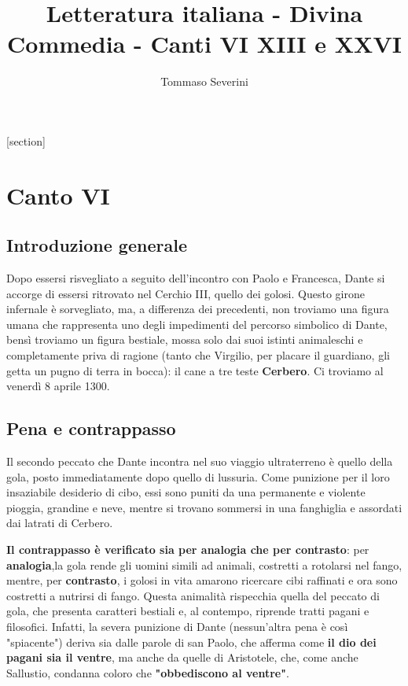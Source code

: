 \documentclass[10pt,a4paper]{article}
\author{Tommaso Severini}
\title{Letteratura italiana - Divina Commedia - Canti VI XIII e XXVI}
\begin{document}
	\maketitle
	
	\tableofcontents
	
	[section]
	
	\section{Canto VI}
	
	\subsection{Introduzione generale}
	
	Dopo essersi risvegliato a seguito dell'incontro con Paolo e Francesca, Dante si accorge di essersi ritrovato nel Cerchio III, quello dei golosi. Questo girone infernale è sorvegliato, ma, a differenza dei precedenti, non troviamo una figura umana che rappresenta uno degli impedimenti del percorso simbolico di Dante, bensì troviamo un figura bestiale, mossa solo dai suoi istinti animaleschi e completamente priva di ragione (tanto che Virgilio, per placare il guardiano, gli getta un pugno di terra in bocca): il cane a tre teste \textbf{Cerbero}. Ci troviamo al venerdì 8 aprile 1300.
	
	\subsection{Pena e contrappasso}
	
	Il secondo peccato che Dante incontra nel suo viaggio ultraterreno è quello della gola, posto immediatamente dopo quello di lussuria. Come punizione per il loro insaziabile desiderio di cibo, essi sono puniti da una permanente e violente pioggia, grandine e neve, mentre si trovano sommersi in una fanghiglia e assordati dai latrati di Cerbero. 
	
	\textbf{Il contrappasso è verificato sia per analogia che per contrasto}: per \textbf{analogia},la gola rende gli uomini simili ad animali, costretti a rotolarsi nel fango, mentre, per \textbf{contrasto}, i golosi in vita amarono ricercare cibi raffinati e ora sono costretti a nutrirsi di fango. Questa animalità rispecchia quella del peccato di gola, che presenta caratteri bestiali e, al contempo, riprende tratti pagani e filosofici. Infatti, la severa punizione di Dante (nessun'altra pena è così "spiacente") deriva sia dalle parole di san Paolo, che afferma come \textbf{il dio dei pagani sia il ventre}, ma anche da quelle di Aristotele, che, come anche Sallustio, condanna coloro che \textbf{"obbediscono al ventre"}.
	
\end{document}
